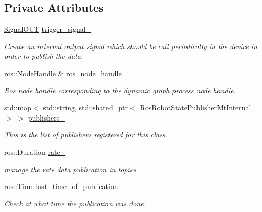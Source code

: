 \subsection*{Private Attributes}
\begin{DoxyCompactItemize}
\item 
\hyperlink{namespacedynamic__graph_a9d80c350c95e161319d7a6e629ecdc4b}{Signal\+O\+UT} \hyperlink{classdynamic__graph_1_1RosRobotStatePublisherMt_af44e1e178bd62374b9b77a630d66ae71}{trigger\+\_\+signal\+\_\+}
\begin{DoxyCompactList}\small\item\em Create an internal output signal which should be call periodically in the device in order to publish the data. \end{DoxyCompactList}\item 
ros\+::\+Node\+Handle \& \hyperlink{classdynamic__graph_1_1RosRobotStatePublisherMt_ad317cb381f8a903622833a384fb9e416}{ros\+\_\+node\+\_\+handle\+\_\+}\hypertarget{classdynamic__graph_1_1RosRobotStatePublisherMt_ad317cb381f8a903622833a384fb9e416}{}\label{classdynamic__graph_1_1RosRobotStatePublisherMt_ad317cb381f8a903622833a384fb9e416}

\begin{DoxyCompactList}\small\item\em Ros node handle corresponding to the dynamic graph process node handle. \end{DoxyCompactList}\item 
std\+::map$<$ std\+::string, std\+::shared\+\_\+ptr$<$ \hyperlink{structdynamic__graph_1_1RosRobotStatePublisherMtInternal}{Ros\+Robot\+State\+Publisher\+Mt\+Internal} $>$ $>$ \hyperlink{classdynamic__graph_1_1RosRobotStatePublisherMt_a0ff7fbacd021e14f3abcae8dbd5c4ec0}{publishers\+\_\+}
\begin{DoxyCompactList}\small\item\em This is the list of publishers registered for this class. \end{DoxyCompactList}\item 
ros\+::\+Duration \hyperlink{classdynamic__graph_1_1RosRobotStatePublisherMt_a5e7825cca5321d2d535e04a78a789834}{rate\+\_\+}\hypertarget{classdynamic__graph_1_1RosRobotStatePublisherMt_a5e7825cca5321d2d535e04a78a789834}{}\label{classdynamic__graph_1_1RosRobotStatePublisherMt_a5e7825cca5321d2d535e04a78a789834}

\begin{DoxyCompactList}\small\item\em manage the rate data publication in topics \end{DoxyCompactList}\item 
ros\+::\+Time \hyperlink{classdynamic__graph_1_1RosRobotStatePublisherMt_a3fc518e75944ca45b886b0db99d342c8}{last\+\_\+time\+\_\+of\+\_\+publication\+\_\+}\hypertarget{classdynamic__graph_1_1RosRobotStatePublisherMt_a3fc518e75944ca45b886b0db99d342c8}{}\label{classdynamic__graph_1_1RosRobotStatePublisherMt_a3fc518e75944ca45b886b0db99d342c8}

\begin{DoxyCompactList}\small\item\em Check at what time the publication was done. \end{DoxyCompactList}\end{DoxyCompactItemize}
